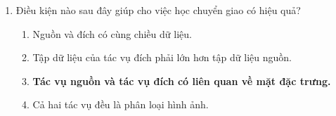\documentclass{book}
\begin{document}
\begin{enumerate}
    \item Điều kiện nào sau đây giúp cho việc học chuyển giao có hiệu quả?
    \begin{multicols}{2}
        \begin{enumerate}[label=\Alph*]
            \item Nguồn và đích có cùng chiều dữ liệu.
            \item Tập dữ liệu của tác vụ đích phải lớn hơn tập dữ liệu nguồn.
            \item \textbf{Tác vụ nguồn và tác vụ đích có liên quan về mặt đặc trưng.}
            \item Cả hai tác vụ đều là phân loại hình ảnh.
        \end{enumerate}
    \end{multicols}
\end{enumerate}
\end{document}

